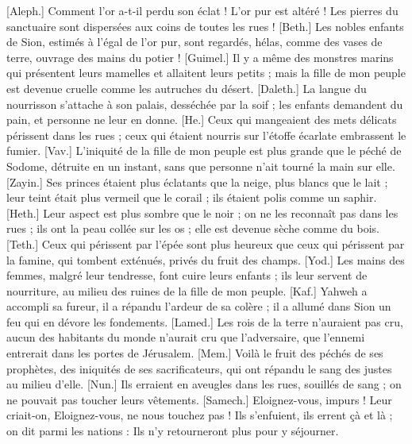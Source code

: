 \begin{multicols}{2}
\VerseOne{}[Aleph.] Comment l’or a-t-il perdu son éclat ! L'or pur est altéré ! Les pierres du sanctuaire sont dispersées aux coins de toutes les rues !
[Beth.] Les nobles enfants de Sion, estimés à l'égal de l'or pur, sont regardés, hélas, comme des vases de terre, ouvrage des mains du potier !
[Guimel.] Il y a même des monstres marins qui présentent leurs mamelles et allaitent leurs petits ; mais la fille de mon peuple est devenue cruelle comme les autruches du désert.
[Daleth.] La langue du nourrisson s'attache à son palais, desséchée par la soif ; les enfants demandent du pain, et personne ne leur en donne.
[He.] Ceux qui mangeaient des mets délicats périssent dans les rues ; ceux qui étaient nourris sur l’étoffe écarlate embrassent le fumier.
[Vav.] L’iniquité de la fille de mon peuple est plus grande que le péché de Sodome, détruite en un instant, sans que personne n’ait tourné la main sur elle.
[Zayin.] Ses princes étaient plus éclatants que la neige, plus blancs que le lait ; leur teint était plus vermeil que le corail ; ils étaient polis comme un saphir.
[Heth.] Leur aspect est plus sombre que le noir ; on ne les reconnaît pas dans les rues ; ils ont la peau collée sur les os ; elle est devenue sèche comme du bois.
[Teth.] Ceux qui périssent par l’épée sont plus heureux que ceux qui périssent par la famine, qui tombent exténués, privés du fruit des champs.
[Yod.] Les mains des femmes, malgré leur tendresse, font cuire leurs enfants ; ils leur servent de nourriture, au milieu des ruines de la fille de mon peuple.
[Kaf.] Yahweh a accompli sa fureur, il a répandu l’ardeur de sa colère ; il a allumé dans Sion un feu qui en dévore les fondements.
[Lamed.] Les rois de la terre n'auraient pas cru, aucun des habitants du monde n'aurait cru que l’adversaire, que l’ennemi entrerait dans les portes de Jérusalem.
[Mem.] Voilà le fruit des péchés de ses prophètes, des iniquités de ses sacrificateurs, qui ont répandu le sang des justes au milieu d’elle.
[Nun.] Ils erraient en aveugles dans les rues, souillés de sang ; on ne pouvait pas toucher leurs vêtements.
[Samech.] Eloignez-vous, impurs ! Leur criait-on, Eloignez-vous, ne nous touchez pas ! Ils s'enfuient, ils errent çà et là ; on dit parmi les nations : Ils n’y retourneront plus pour y séjourner.

\end{multicols}
